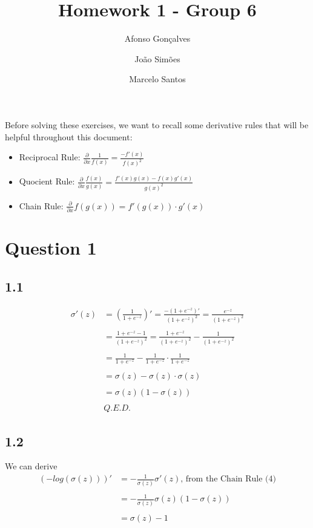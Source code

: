 \documentclass[10pt]{article}
\begin{document}
\title{Homework 1 - Group 6}
\author{Afonso Gonçalves \and João Simões \and Marcelo Santos}
\maketitle

\par
Before solving these exercises, we want to recall some derivative rules that will be helpful throughout this document:
\begin{itemize}
	\item Reciprocal Rule: $\frac{\partial}{\partial x} \frac{1}{f(x)} = \frac{-f'(x)}{f(x)^{2}}$
	\item Quocient Rule: $\frac{\partial}{\partial x}\frac{f(x)}{g(x)} = \frac{f'(x)g(x) - f(x)g'(x)}{g(x)^{2}}$
	\item Chain Rule: $\frac{\partial}{\partial x}f(g(x)) = f'(g(x)) \cdot g'(x)$
\end{itemize}

\section{Question 1}


\subsection{1.1}
\begin{equation}
\begin{aligned}
    \sigma'(z) {} &= \left( \frac{1}{1 + e^{-z}} \right)'
    = \frac{-(1+e^{-z})'}{(1 + e^{-z})^{2}}
    = \frac{e^{-z}}{(1 + e^{-z})^{2}}
    \\ \\
    &= \frac{1 + e^{-z} - 1}{(1 + e^{-z})^{2}}
    = \frac{1 + e^{-z}}{(1 + e^{-z})^{2}} - \frac{1}{(1 + e^{-z})^{2}}
    \\ \\
    &= \frac{1}{1 + e^{-z}} - \frac{1}{1 + e^{-z}} \cdot \frac{1}{1 + e^{-z}}
    \\ \\
    &= \sigma(z) - \sigma(z)\cdot \sigma(z)
    \\ \\
    &= \sigma(z)(1-\sigma(z))
    \\ \\
    &Q.E.D.
\end{aligned}
\end{equation}

\subsection{1.2}
We can derive
\begin{equation}
\begin{aligned}
  (-log(\sigma(z)))' {} & = -\frac{1}{\sigma(z)}\sigma'(z) \text{, from the Chain Rule (4)}
  \\ \\ &
  = -\frac{1}{\sigma(z)}\sigma(z)(1-\sigma(z))
  \\ \\ &
  = \sigma(z) - 1
\end{aligned}
\end{equation}
\end{document}
